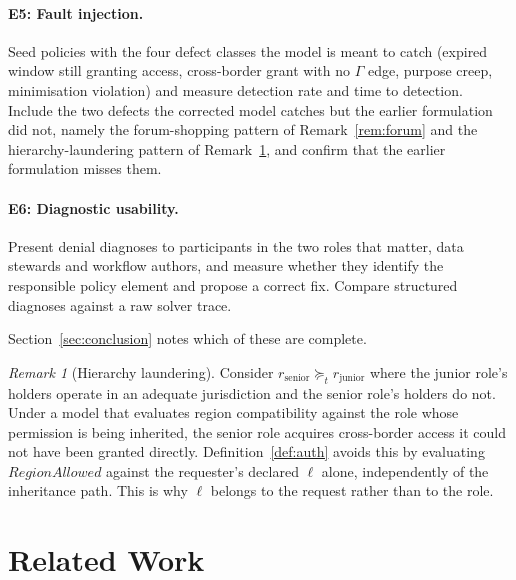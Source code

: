 \documentclass[11pt]{article}
\theoremstyle{definition}
\theoremstyle{plain}
\theoremstyle{remark}
\newtheorem{remark}{Remark}
\newcommand{\RegionOK}{\mathit{RegionAllowed}}
\begin{document}
\paragraph{E5: Fault injection.} Seed policies with the four defect classes the
model is meant to catch (expired window still granting access, cross-border
grant with no $\Gamma$ edge, purpose creep, minimisation violation) and measure
detection rate and time to detection. Include the two defects the corrected
model catches but the earlier formulation did not, namely the forum-shopping
pattern of Remark~\ref{rem:forum} and the hierarchy-laundering pattern of
Remark~\ref{rem:launder}, and confirm that the earlier formulation misses them.

\paragraph{E6: Diagnostic usability.} Present denial diagnoses to participants
in the two roles that matter, data stewards and workflow authors, and measure
whether they identify the responsible policy element and propose a correct fix.
Compare structured diagnoses against a raw solver trace.

Section~\ref{sec:conclusion} notes which of these are complete.

\begin{remark}[Hierarchy laundering]
\label{rem:launder}
Consider $r_{\mathrm{senior}} \succeq_t r_{\mathrm{junior}}$ where the junior
role's holders operate in an adequate jurisdiction and the senior role's holders
do not. Under a model that evaluates region compatibility against the role
whose permission is being inherited, the senior role acquires cross-border
access it could not have been granted directly. Definition~\ref{def:auth} avoids
this by evaluating $\RegionOK$ against the requester's declared $\ell$ alone,
independently of the inheritance path. This is why $\ell$ belongs to the request
rather than to the role.
\end{remark}

\section{Related Work}
\label{sec:related}
\end{document}
